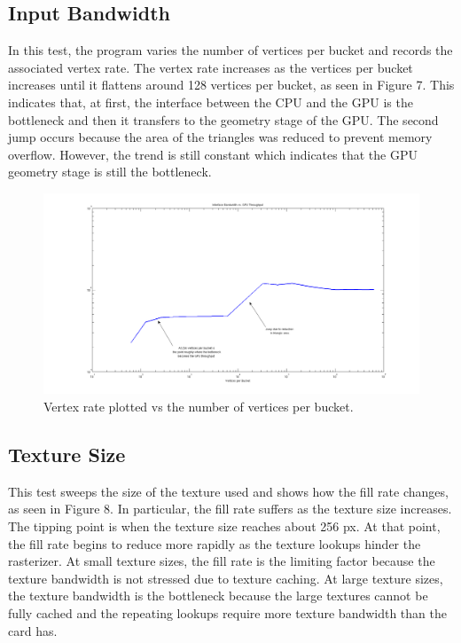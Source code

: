 \documentclass[12pt] {article}
\begin{document}
\subsection{Input Bandwidth}
In this test, the program varies the number of vertices per bucket and records the associated vertex rate. The vertex rate increases as the vertices per bucket increases until it flattens around 128 vertices per bucket, as seen in Figure 7. This indicates that, at first, the interface between the CPU and the GPU is the bottleneck and then it transfers to the geometry stage of the GPU. The second jump occurs because the area of the triangles was reduced to prevent memory overflow. However, the trend is still constant which indicates that the GPU geometry stage is still the bottleneck.
\begin{figure}[ht!]
	\centering
	\includegraphics[width=5in]{figures/results3-interface-vs-GPU.png}
	\caption{Vertex rate plotted vs the number of vertices per bucket.}
\end{figure}
\FloatBarrier

\newpage
\subsection{Texture Size}
This test sweeps the size of the texture used and shows how the fill rate changes, as seen in Figure 8. In particular, the fill rate suffers as the texture size increases. The tipping point is when the texture size reaches about 256 px. At that point, the fill rate begins to reduce more rapidly as the texture lookups hinder the rasterizer. At small texture sizes, the fill rate is the limiting factor because the texture bandwidth is not stressed due to texture caching. At large texture sizes, the texture bandwidth is the bottleneck because the large textures cannot be fully cached and the repeating lookups require more texture bandwidth than the card has.
\end{document}
